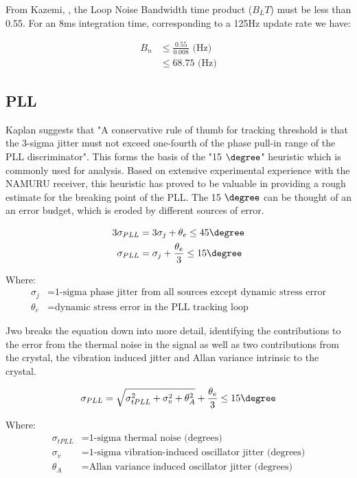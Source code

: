 From Kazemi, \cite{Kazemi2008}, the Loop Noise Bandwidth time product ($B_L T$) must be less than 0.55. 
For an 8ms integration time, corresponding to a 125Hz update rate we have:

\begin{align*}
B_n &\leq \frac{0.55}{0.008} \text{ (Hz)}\\
    &\leq 68.75 \text{ (Hz)}
\end{align*}

\subsection{PLL}
Kaplan suggests that "A conservative rule of thumb for tracking threshold is that the 3-sigma jitter must not exceed one-fourth of the phase pull-in range of the PLL discriminator"\cite{Kaplan}. This forms the basis of the "15 $\degree$" heuristic which is commonly used for analysis. Based on extensive experimental experience with the \ac{NAMURU} receiver, this heuristic has proved to be valuable in providing a rough estimate for the breaking point of the PLL. The 15 $\degree$ can be thought of an an error budget, which is eroded by different sources of error.

\begin{align}
3 \sigma_{PLL} &= 3 \sigma_j +\theta_e \leq 45 \degree\\
\sigma_{PLL} &=\sigma_j + \frac{\theta_e}{3} \leq 15 \degree
\end{align}

Where:
\begin{align*}
\sigma_j &= \text{1-sigma phase jitter from all sources except dynamic stress error} \\
\theta_e &= \text{dynamic stress error in the PLL tracking loop}
\end{align*}

Jwo breaks the equation down into more detail\cite{Jwo}, identifying the contributions to the error from the thermal noise in the signal as well as two contributions from the crystal, the vibration induced jitter and Allan variance intrinsic to the crystal.


\begin{equation}
\sigma_{PLL} = \sqrt{\sigma^2_{tPLL} + \sigma^2_v+ \theta^2_A} + \frac{\theta_e}{3} \leq 15 \degree 
\end{equation}

Where:
\begin{align*}
\sigma_{tPLL} &= \text{1-sigma thermal noise (degrees)}\\
\sigma_v &= \text{1-sigma vibration-induced oscillator jitter (degrees)}\\
\theta_A &= \text{Allan variance induced oscillator jitter (degrees)}
\end{align*}


